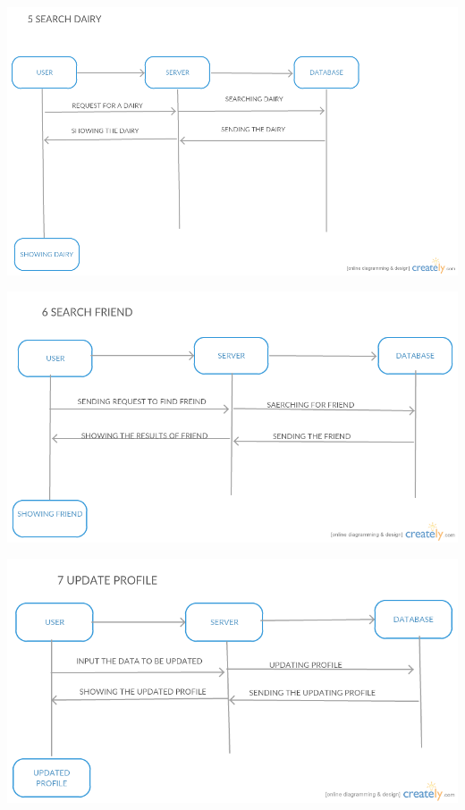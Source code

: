 \documentclass{article}
\begin{document}
\begin{center}
\includegraphics[scale=0.6]{search_dairy.png}
\newpage
\graphicspath{ {/home/smily/Desktop/search_friend.png} }
\centering
\includegraphics[scale=0.5]{search_friend.png}
\newpage
\graphicspath{ {/home/smily/Desktop/update_profile.png} }
\centering
\includegraphics[scale=0.6]{update_profile.png}
\end{center}
\end{document}
